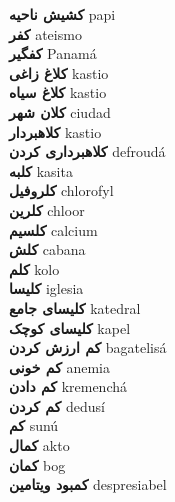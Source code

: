 \textbf{ کشیش ناحیه  } papi \\
\textbf{ کفر  } ateismo \\
\textbf{ کفگیر  } Panamá \\
\textbf{ کلاغ زاغی  } kastio \\
\textbf{ کلاغ سیاه  } kastio \\
\textbf{ کلان شهر  } ciudad \\
\textbf{ کلاهبردار  } kastio \\
\textbf{ کلاهبرداری کردن  } defroudá \\
\textbf{ کلبه  } kasita \\
\textbf{ کلروفیل  } chlorofyl \\
\textbf{ کلرین  } chloor \\
\textbf{ کلسیم  } calcium \\
\textbf{ کلش  } cabana \\
\textbf{ کلم  } kolo \\
\textbf{ کلیسا  } iglesia \\
\textbf{ کلیسای جامع  } katedral \\
\textbf{ کلیسای کوچک  } kapel \\
\textbf{ کم ارزش کردن  } bagatelisá \\
\textbf{ کم خونی  } anemia \\
\textbf{ کم دادن  } kremenchá \\
\textbf{ کم کردن  } dedusí \\
\textbf{ کم  } sunú \\
\textbf{ کمال  } akto \\
\textbf{ کمان  } bog \\
\textbf{ کمبود ویتامین  } despresiabel \\
